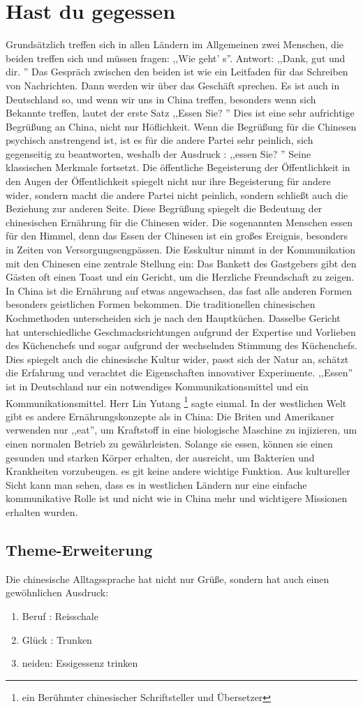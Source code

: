 \section{Hast du gegessen}
Grundsätzlich treffen sich in allen Ländern im Allgemeinen zwei Menschen,  die beiden treffen sich und müssen fragen: ,,Wie geht' s''. Antwort: ,,Dank,  gut und dir. '' Das Gespräch zwischen den beiden ist wie ein Leitfaden für das Schreiben von Nachrichten.  Dann werden wir über das Geschäft sprechen.  Es ist auch in Deutschland so, und wenn wir uns in China treffen, besonders wenn sich Bekannte treffen, lautet der erste Satz ,,Essen Sie? '' Dies ist eine sehr aufrichtige Begrü\ss ung an China, nicht nur Höflichkeit.
\mypar
Wenn die Begrü\ss ung für die Chinesen psychisch anstrengend ist, ist es für die andere Partei sehr peinlich, sich gegenseitig zu beantworten, weshalb der Ausdruck : ,,essen Sie? '' Seine klassischen Merkmale fortsetzt. Die öffentliche Begeisterung der Öffentlichkeit in den Augen der Öffentlichkeit spiegelt nicht nur ihre Begeisterung für andere wider, sondern macht die andere Partei nicht peinlich, sondern schlie\ss t auch die Beziehung zur anderen Seite.
\mypar
Diese Begrü\ss ung spiegelt die Bedeutung der chinesischen Ernährung für die Chinesen wider. Die sogenannten Menschen essen für den Himmel, denn das Essen der Chinesen ist ein gro\ss es Ereignis, besonders in Zeiten von Versorgungsengpässen. Die Esskultur nimmt in der Kommunikation mit den Chinesen eine zentrale Stellung ein: Das Bankett des Gastgebers gibt den Gästen oft einen Toast und ein Gericht, um die Herzliche Freundschaft  zu zeigen. In China ist die Ernährung auf etwas angewachsen, das fast alle anderen Formen besonders geistlichen Formen bekommen.
\mypar
Die traditionellen chinesischen Kochmethoden unterscheiden sich je nach den Hauptküchen. Dasselbe Gericht hat unterschiedliche Geschmacksrichtungen aufgrund der Expertise und Vorlieben des Küchenchefs und sogar aufgrund der wechselnden Stimmung des Küchenchefs. Dies spiegelt auch die chinesische Kultur wider, passt sich der Natur an, schätzt die Erfahrung und verachtet die Eigenschaften innovativer Experimente.
\mypar
,,Essen'' ist in Deutschland nur ein notwendiges Kommunikationsmittel und ein Kommunikationsmittel. Herr Lin Yutang \footnote{ein Berühmter chinesischer Schriftsteller und Übersetzer} sagte einmal. In der westlichen Welt gibt es andere Ernährungskonzepte als in China: Die Briten und Amerikaner verwenden nur ,,eat'', um Kraftstoff in eine biologische Maschine zu injizieren, um einen normalen Betrieb zu gewährleisten. Solange sie essen, können sie einen gesunden und starken Körper erhalten, der ausreicht, um Bakterien und Krankheiten vorzubeugen. es git keine andere wichtige Funktion.  Aus kultureller Sicht kann man sehen, dass es in westlichen Ländern nur eine einfache kommunikative Rolle ist und nicht wie in China mehr und wichtigere Missionen erhalten wurden.

\subsection{Theme-Erweiterung}
Die chinesische Alltagssprache hat nicht nur Grü\ss e, sondern hat auch einen gew\"ohnlichen Ausdruck:
\begin{enumerate}
	\item Beruf :  Reisschale
	\item Glück : Trunken
	\item neiden:  Essigessenz trinken
\end{enumerate}